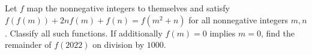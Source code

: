 Let $ f $ map the nonnegative integers to themselves and satisfy $ f(f(m))+2nf(m)+f(n)=f(m^2+n)$ for all nonnegative integers $ m,n $. Classify all such functions. If additionally $ f(m)=0 $ implies $ m=0 $, find the remainder of $ f(2022)$ on division by $ 1000 $.
